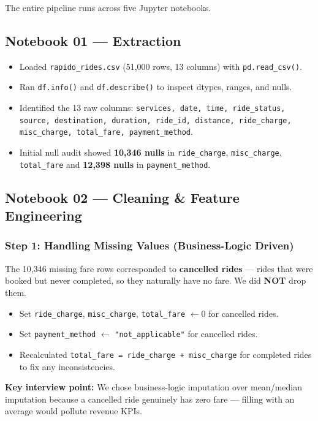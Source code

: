 \documentclass[12pt,a4paper]{article}
\begin{document}
The entire pipeline runs across five Jupyter notebooks.

\subsection{Notebook 01 --- Extraction}
\begin{itemize}
  \item Loaded \texttt{rapido\_rides.csv} (51,000 rows, 13 columns) with \texttt{pd.read\_csv()}.
  \item Ran \texttt{df.info()} and \texttt{df.describe()} to inspect dtypes, ranges, and nulls.
  \item Identified the 13 raw columns: \texttt{services, date, time, ride\_status, source, destination, duration, ride\_id, distance, ride\_charge, misc\_charge, total\_fare, payment\_method}.
  \item Initial null audit showed \textbf{10,346 nulls} in \texttt{ride\_charge}, \texttt{misc\_charge}, \texttt{total\_fare} and \textbf{12,398 nulls} in \texttt{payment\_method}.
\end{itemize}

\subsection{Notebook 02 --- Cleaning \& Feature Engineering}

\subsubsection{Step 1: Handling Missing Values (Business-Logic Driven)}
The 10,346 missing fare rows corresponded to \textbf{cancelled rides} --- rides that were booked but never completed, so they naturally have no fare. We did \textbf{NOT} drop them.

\begin{itemize}
  \item Set \texttt{ride\_charge}, \texttt{misc\_charge}, \texttt{total\_fare} $\leftarrow 0$ for cancelled rides.
  \item Set \texttt{payment\_method} $\leftarrow$ \texttt{"not\_applicable"} for cancelled rides.
  \item Recalculated \texttt{total\_fare = ride\_charge + misc\_charge} for completed rides to fix any inconsistencies.
\end{itemize}

\textbf{Key interview point:} We chose business-logic imputation over mean/median imputation because a cancelled ride genuinely has zero fare --- filling with an average would pollute revenue KPIs.
\end{document}
